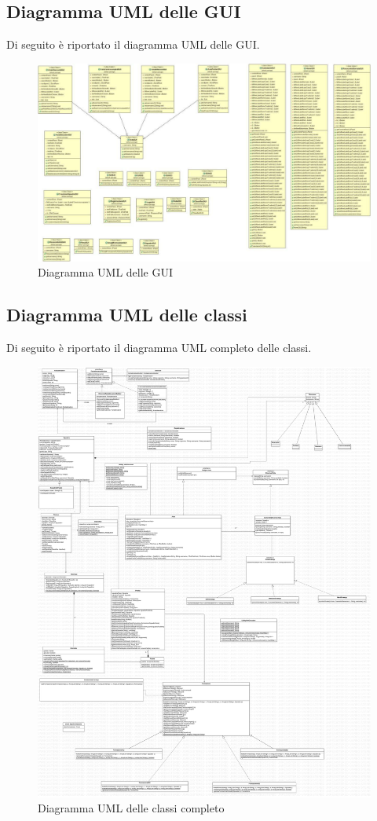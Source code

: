 \documentclass[12pt,a4paper]{article}
\begin{document}
\subsection{Diagramma UML delle GUI}
Di seguito è riportato il diagramma UML delle GUI.\\
\begin{figure}[h]
\centering
\includegraphics[width=11 cm,keepaspectratio]{UMLGui.png}
\caption{Diagramma UML delle GUI}
\end{figure}
\newpage
\subsection{Diagramma UML delle classi}
Di seguito è riportato il diagramma UML completo delle classi.\\
\begin{figure}[h]
\centering
\includegraphics[width=14 cm,keepaspectratio]{UML.jpg}
\caption{Diagramma UML delle classi completo}
\end{figure}
\newpage
\end{document}
